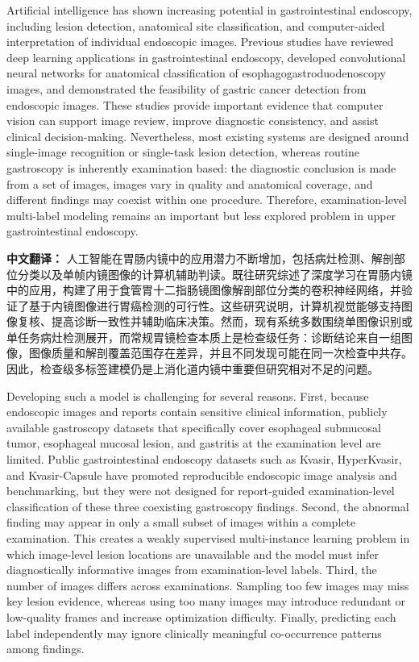 \documentclass[Afour,sagev,times]{sagej}
\begin{document}
Artificial intelligence has shown increasing potential in gastrointestinal endoscopy, including lesion detection, anatomical site classification, and computer-aided interpretation of individual endoscopic images.
Previous studies have reviewed deep learning applications in gastrointestinal endoscopy, developed convolutional neural networks for anatomical classification of esophagogastroduodenoscopy images, and demonstrated the feasibility of gastric cancer detection from endoscopic images.
These studies provide important evidence that computer vision can support image review, improve diagnostic consistency, and assist clinical decision-making.
Nevertheless, most existing systems are designed around single-image recognition or single-task lesion detection, whereas routine gastroscopy is inherently examination based: the diagnostic conclusion is made from a set of images, images vary in quality and anatomical coverage, and different findings may coexist within one procedure. Therefore, examination-level multi-label modeling remains an important but less explored problem in upper gastrointestinal endoscopy.\cite{R1,R2,R3}

\textbf{中文翻译：} 人工智能在胃肠内镜中的应用潜力不断增加，包括病灶检测、解剖部位分类以及单帧内镜图像的计算机辅助判读。既往研究综述了深度学习在胃肠内镜中的应用，构建了用于食管胃十二指肠镜图像解剖部位分类的卷积神经网络，并验证了基于内镜图像进行胃癌检测的可行性。这些研究说明，计算机视觉能够支持图像复核、提高诊断一致性并辅助临床决策。然而，现有系统多数围绕单图像识别或单任务病灶检测展开，而常规胃镜检查本质上是检查级任务：诊断结论来自一组图像，图像质量和解剖覆盖范围存在差异，并且不同发现可能在同一次检查中共存。因此，检查级多标签建模仍是上消化道内镜中重要但研究相对不足的问题。

Developing such a model is challenging for several reasons. First, because endoscopic images and reports contain sensitive clinical information, publicly available gastroscopy datasets that specifically cover esophageal submucosal tumor, esophageal mucosal lesion, and gastritis at the examination level are limited. Public gastrointestinal endoscopy datasets such as Kvasir, HyperKvasir, and Kvasir-Capsule have promoted reproducible endoscopic image analysis and benchmarking, but they were not designed for report-guided examination-level classification of these three coexisting gastroscopy findings.\cite{R4,R5,R6} Second, the abnormal finding may appear in only a small subset of images within a complete examination. This creates a weakly supervised multi-instance learning problem in which image-level lesion locations are unavailable and the model must infer diagnostically informative images from examination-level labels.\cite{R7} Third, the number of images differs across examinations. Sampling too few images may miss key lesion evidence, whereas using too many images may introduce redundant or low-quality frames and increase optimization difficulty. Finally, predicting each label independently may ignore clinically meaningful co-occurrence patterns among findings.
\end{document}
